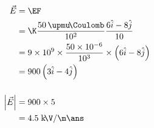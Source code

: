 \documentclass{article}
\begin{document}
\begin{align*}
\vec{E} &= \EF\\
		&= \K \dfrac{50\,\upmu\!\Coulomb}{10^2} \dfrac{6\hat{i}-8\hat{j}}{10}\\
		&=9 \times 10^9 \times \dfrac{50 \times 10^{-6}}{10^3} \times \left(6\hat{i}-8\hat{j}\right)\\
		&= 900\left(3\hat{i}-4\hat{j}\right)\\[5mm]
\left|\vec{E}\right| &= 900 \times 5\\
		&= 4.5 \;\text{k}\!\V/\m \ans
\end{align*}

\pagebreak

\vspace*{\fill}
\begin{center}
	\fbox{\qrcode[height=2cm]{\gdrive}}
\end{center}
\vspace*{\fill}
\end{document}

